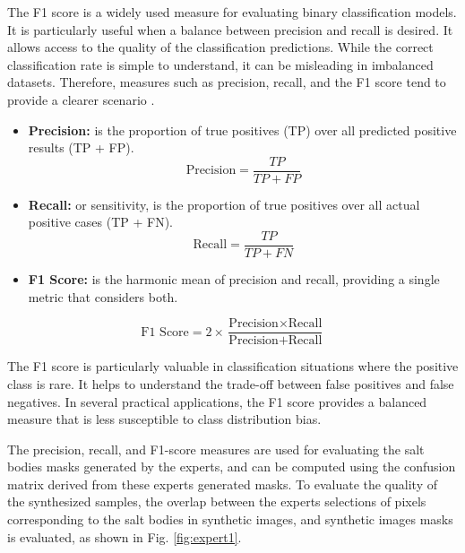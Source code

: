 \documentclass{ieeeaccess}
\begin{document}
The F1 score is a widely used measure for evaluating binary classification models. It is particularly useful when a balance between precision and recall is desired. It allows access to the quality of the classification predictions. While the correct classification rate is simple to understand, it can be misleading in imbalanced datasets. Therefore, measures such as precision, recall, and the F1 score tend to provide a clearer scenario \cite{ref14}.

\begin{itemize}
    \item \textbf{Precision:} is the proportion of true positives (TP) over all predicted positive results (TP + FP).
    \begin{equation}
    \text{Precision} = \frac{TP}{TP + FP}
    \end{equation}

    \item \textbf{Recall:} or sensitivity, is the proportion of true positives over all actual positive cases (TP + FN).
    \begin{equation}
    \text{Recall} = \frac{TP}{TP + FN}
    \end{equation}


    \item \textbf{F1 Score:} is the harmonic mean of precision and recall, providing a single metric that considers both. 

\end{itemize}
    \begin{equation}
    \text{F1 Score} = 2 \times \frac{\text{Precision} \times \text{Recall}}{\text{Precision} + \text{Recall}}
    \end{equation}
    
 The F1 score is particularly valuable in classification situations where the positive class is rare. It helps to understand the trade-off between false positives and false negatives. In several practical applications, the F1 score provides a balanced measure that is less susceptible to class distribution bias.

The precision, recall, and F1-score measures are used for evaluating the salt bodies masks generated by the experts, and can be computed using the confusion matrix derived from these experts generated masks. To evaluate the quality of the synthesized samples, the overlap between the experts selections of pixels corresponding to the salt bodies in synthetic images, and synthetic images masks is evaluated, as shown in Fig. \ref{fig:expert1}.
\end{document}

